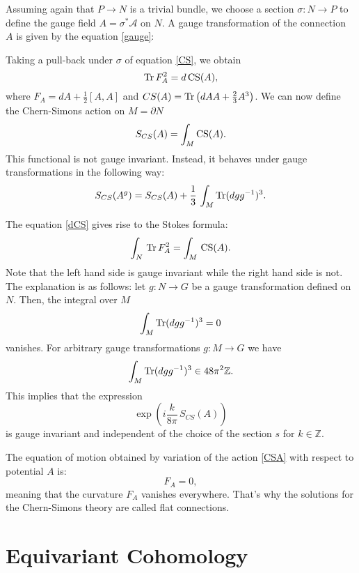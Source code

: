 \documentclass[11pt]{report}
\theoremstyle{plain}
\theoremstyle{definition}
\theoremstyle{remark}
\theoremstyle{remark}
\numberwithin{equation}{section}
\begin{document}
Assuming again that $P\to N$ is a trivial bundle, we choose a section
$\sigma: N \to P$ to define the gauge field $A= \sigma^*\mathcal{A}$ on $N$. A gauge transformation of the connection $A$ is given by the equation \eqref{gauge}:

Taking a pull-back under $\sigma$ of equation \eqref{CS}, we obtain
%
\begin{equation} \label{dCS}
{\rm Tr} \, F_A^2 = d \, {\rm CS}(A),
\end{equation}
where $F_A=dA + \frac{1}{2} [A,A]$ and $CS(A)={\rm Tr} \left( dAA + \frac{2}{3} A^3 \right)$.
We can now define the Chern-Simons action on $M= \partial N$
%
\begin{equation}\label{CSA}
S_{CS} (A) = \int_M {\rm CS}(A).
\end{equation}
This functional is not gauge invariant. Instead, it behaves under gauge transformations in the following way:
%
$$
S_{CS}(A^g)=S_{CS}(A) + \frac{1}{3} \, \int_M {\rm Tr}(dgg^{-1})^3.
$$

The equation \eqref{dCS} gives rise to the Stokes formula:
%
\begin{equation}\label{BB1}
\int_N \, {\rm Tr} \, F_A^2 = \int_M \, {\rm CS}(A).
\end{equation}
Note that the left hand side is gauge invariant while the right hand side is not. The explanation is as follows: let $g: N \to G$ be a gauge transformation defined on $N$. Then, the integral over $M$
%
$$
\int_M {\rm Tr}(dgg^{-1})^3 = 0
$$
vanishes. For arbitrary gauge transformations $g: M \to G$ we have
%
$$
\int_M {\rm Tr}(dgg^{-1})^3 \in 48 \pi^2 \mathbb{Z}.
$$
This implies that the expression
%
$$
\exp\left(i \frac{k}{8\pi} \, S_{CS}(A)\right)
$$
is gauge invariant and independent of the choice of the section $s$ for $k \in \mathbb{Z}$.

The equation of motion obtained by variation of the action \eqref{CSA} with respect to potential $A$ is:
\begin{equation} 
F_A=0,
\end{equation}
meaning that the curvature $F_A$ vanishes everywhere. That\rq{}s why the solutions for the Chern-Simons theory are called flat connections. 












\section{Equivariant Cohomology}
\end{document}
